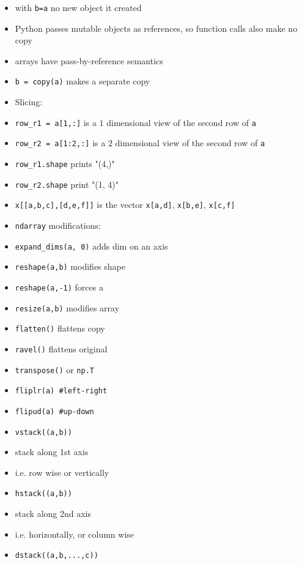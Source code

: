 \documentclass[onecolumn]{IEEEtran} %
\begin{document}
\begin{itemize}
        \bi
            \item with \verb|b=a| no new object it created
            \item Python passes mutable objects as references, so function calls also make no copy
            \item arrays have pass-by-reference semantics
        \ei
        \item \verb|b = copy(a)| makes a separate copy
    \ei
    \item Slicing:
    \bi
        \item \verb|row_r1 = a[1,:]| is a $1$ dimensional view of the second row of \verb|a|
        \item \verb|row_r2 = a[1:2,:]| is a $2$ dimensional view of the second row of \verb|a|
        \item \verb|row_r1.shape| prints "(4,)"
        \item \verb|row_r2.shape| print "(1, 4)"
        \item \verb|x[[a,b,c],[d,e,f]]| is the vector  \newline \verb|x[a,d]|, \verb|x[b,e]|, \verb|x[c,f]|
    \ei
     \item \verb|ndarray| modifications:
     \bi
        \item \verb|expand_dims(a, 0)| adds dim on an axis
        \item \verb|reshape(a,b)| modifies shape
        \item \verb|reshape(a,-1)| forces a
        \item \verb|resize(a,b)| modifies array
        \item \verb|flatten()| flattens copy
        \item \verb|ravel()| flattens original
        \item \verb|transpose()| or \verb|np.T|
        \item \verb|fliplr(a) #left-right|
        \item \verb|flipud(a) #up-down|
        \item \verb|vstack((a,b))|
        \bi
            \item  stack along 1st axis
            \item i.e. row wise or vertically
        \ei
        \item \verb|hstack((a,b))|
        \bi
            \item stack along 2nd axis
            \item i.e. horizontally, or column wise
        \ei
        \item \verb|dstack((a,b,...,c))|

\end{itemize}
\end{document}
